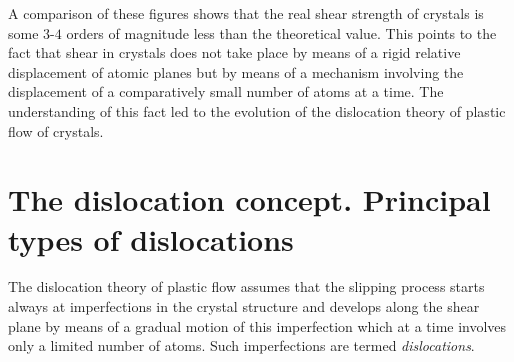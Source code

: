 \begin{table}[!b]
	\renewcommand{\arraystretch}{1.2}
	\caption{}
	\vspace{-0.6cm}
	\label{table:2_4}
	\begin{center}\end{center}
\end{table}

A comparison of these figures shows that the real shear strength of crystals is some $3$-$4$ orders of magnitude less than the theoretical value. This points to the fact that shear in crystals does not take place by means of a rigid relative displacement of atomic planes but by means of a mechanism involving the displacement of a comparatively small number of atoms at a time. The understanding of this fact led to the evolution of the dislocation theory of plastic flow of crystals.

\section{The dislocation concept. Principal types of dislocations}\label{sec:17}

The dislocation theory of plastic flow assumes that the slipping process starts always at imperfections in the crystal structure and develops along the shear plane by means of a gradual motion of this imperfection which at a time involves only a limited number of atoms. Such imperfections are termed \textit{dislocations}.

